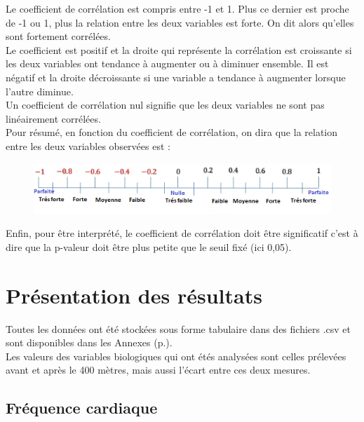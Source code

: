                 Le coefficient de corrélation est compris entre -1 et 1. Plus ce dernier est proche de -1 ou 1, plus la relation entre les deux variables est forte. On dit alors qu'elles sont fortement corrélées.\\
                
                Le coefficient est positif et la droite qui représente la corrélation est croissante si les deux variables ont tendance à augmenter ou à diminuer ensemble. Il est négatif et la droite décroissante si une variable a tendance à augmenter lorsque l'autre diminue.\\
                
                Un coefficient de corrélation nul signifie que les deux variables ne sont pas linéairement corrélées.\\ 
                 
                Pour résumé, en fonction du coefficient de corrélation, on dira que la relation entre les deux variables observées est :

                 \begin{figure}[H]
                    \centering \includegraphics[scale=1]{images/coeff_corr}
                \end{figure}
            
 
              Enfin, pour être interprété, le coefficient de corrélation doit être significatif c'est à dire que la p-valeur doit être plus petite que le seuil fixé (ici 0,05).
 
 
    \section{Présentation des résultats}
    
        Toutes les données ont été stockées sous forme tabulaire dans des fichiers .csv et sont disponibles dans les Annexes (p.\pageref{annexe}).\\
        
        Les valeurs des variables biologiques qui ont étés analysées sont celles prélevées avant et après le 400 mètres, mais aussi l'écart entre ces deux mesures.\\
    
        \subsection{Fréquence cardiaque}
        \label{section:resfc}
        
